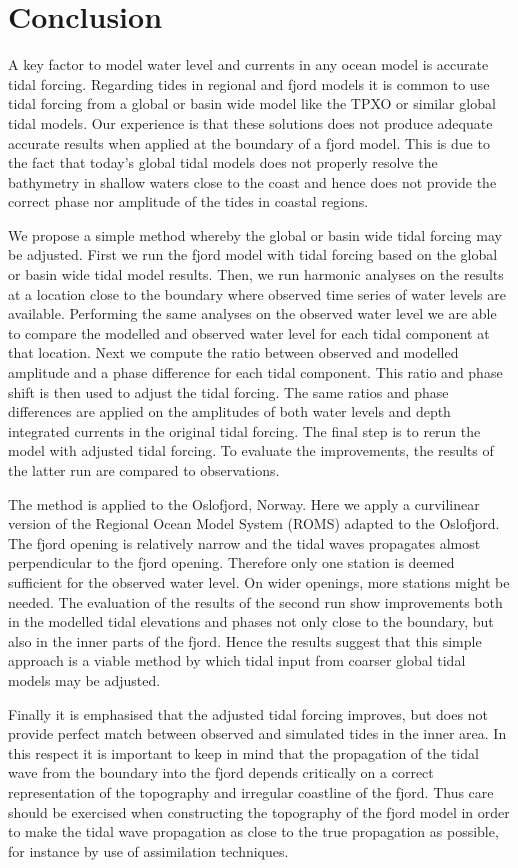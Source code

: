 \section{Conclusion}

A key factor to model water level and currents in any ocean model is accurate tidal forcing. Regarding tides in regional and fjord models it is common to use tidal forcing from a global or basin wide model like the TPXO or similar global tidal models. Our experience is that these solutions does not produce adequate accurate results when applied at the boundary of a fjord model. This is due to the fact that today's global tidal models does not properly resolve the bathymetry in shallow waters close to the coast and hence does not provide the correct phase nor amplitude of the tides in coastal regions. 

We propose a simple method whereby the global or basin wide tidal forcing may be adjusted. First we run the fjord model with tidal forcing based on the global or basin wide tidal model results. Then, we run harmonic analyses on the results at a location close to the boundary where observed time series of water levels are available. Performing the same analyses on the observed water level we are able to compare the modelled and observed water level for each tidal component at that location. Next we compute the ratio between observed and modelled amplitude and a phase difference for each tidal component. This ratio and phase shift is then used to adjust the tidal forcing. The same ratios and phase differences are applied on the amplitudes of both water levels and depth integrated currents in the original tidal forcing. The final step is to rerun the model with adjusted tidal forcing. To evaluate the improvements, the results of the latter run are compared to observations.

The method is applied to the Oslofjord, Norway. Here we apply a curvilinear version of the Regional Ocean Model System (ROMS) adapted to the Oslofjord. The fjord opening is relatively narrow and the tidal waves propagates almost perpendicular to the fjord opening. Therefore only one station is deemed sufficient for the observed water level. On wider openings, more stations might be needed. The evaluation of the results of the second run show improvements both in the modelled tidal elevations and phases not only close to the boundary, but also in the inner parts of the fjord. Hence the results suggest that this simple approach is a viable method by which tidal input from coarser global tidal models may be adjusted. 

Finally it is emphasised that the adjusted tidal forcing improves, but does not provide perfect match between observed and simulated tides in the inner area. In this respect it is important to keep in mind that the propagation of the tidal wave from the boundary into the fjord depends critically on a correct representation of the topography and irregular coastline of the fjord. Thus care should be exercised when constructing the topography of the fjord model in order to make the tidal wave propagation as close to the true propagation as possible, for instance by use of assimilation techniques.
